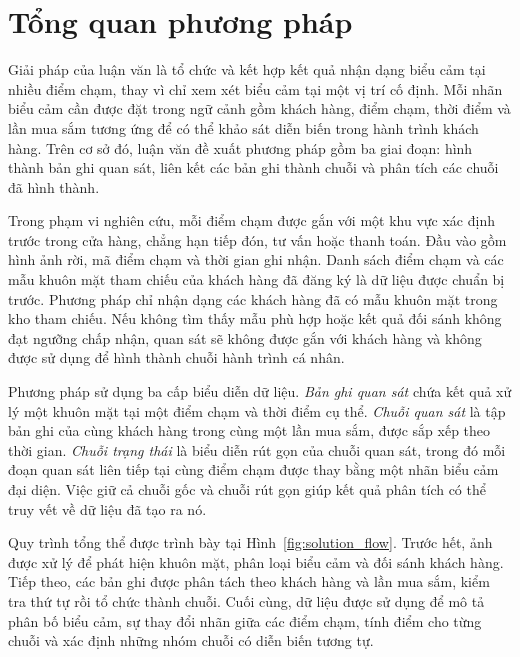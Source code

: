 \documentclass[../LuanVan.tex]{subfiles}
\begin{document}
\section{Tổng quan phương pháp}
\label{section:3.1}

Giải pháp của luận văn là tổ chức và kết hợp kết quả nhận dạng biểu cảm tại nhiều điểm chạm, thay vì chỉ xem xét biểu cảm tại một vị trí cố định. Mỗi nhãn biểu cảm cần được đặt trong ngữ cảnh gồm khách hàng, điểm chạm, thời điểm và lần mua sắm tương ứng để có thể khảo sát diễn biến trong hành trình khách hàng. Trên cơ sở đó, luận văn đề xuất phương pháp gồm ba giai đoạn: hình thành bản ghi quan sát, liên kết các bản ghi thành chuỗi và phân tích các chuỗi đã hình thành.

Trong phạm vi nghiên cứu, mỗi điểm chạm được gắn với một khu vực xác định trước trong cửa hàng, chẳng hạn tiếp đón, tư vấn hoặc thanh toán. Đầu vào gồm hình ảnh rời, mã điểm chạm và thời gian ghi nhận. Danh sách điểm chạm và các mẫu khuôn mặt tham chiếu của khách hàng đã đăng ký là dữ liệu được chuẩn bị trước. 
Phương pháp chỉ nhận dạng các khách hàng đã có mẫu khuôn mặt trong kho tham chiếu. Nếu không tìm thấy mẫu phù hợp hoặc kết quả đối sánh không đạt ngưỡng chấp nhận, quan sát sẽ không được gắn với khách hàng và không được sử dụng để hình thành chuỗi hành trình cá nhân.

Phương pháp sử dụng ba cấp biểu diễn dữ liệu. \textit{Bản ghi quan sát} chứa kết quả xử lý một khuôn mặt tại một điểm chạm và thời điểm cụ thể. \textit{Chuỗi quan sát} là tập bản ghi của cùng khách hàng trong cùng một lần mua sắm, được sắp xếp theo thời gian. \textit{Chuỗi trạng thái} là biểu diễn rút gọn của chuỗi quan sát, trong đó mỗi đoạn quan sát liên tiếp tại cùng điểm chạm được thay bằng một nhãn biểu cảm đại diện. Việc giữ cả chuỗi gốc và chuỗi rút gọn giúp kết quả phân tích có thể truy vết về dữ liệu đã tạo ra nó.

Quy trình tổng thể được trình bày tại Hình~\ref{fig:solution_flow}. Trước hết, ảnh được xử lý để phát hiện khuôn mặt, phân loại biểu cảm và đối sánh khách hàng. Tiếp theo, các bản ghi được phân tách theo khách hàng và lần mua sắm, kiểm tra thứ tự rồi tổ chức thành chuỗi. Cuối cùng, dữ liệu được sử dụng để mô tả phân bố biểu cảm, sự thay đổi nhãn giữa các điểm chạm, tính điểm cho từng chuỗi và xác định những nhóm chuỗi có diễn biến tương tự.
\end{document}
